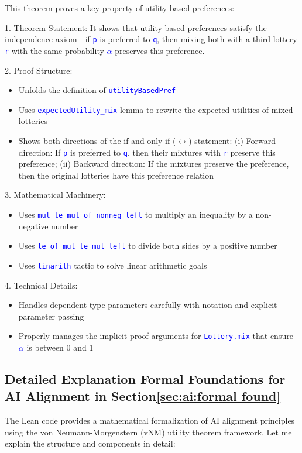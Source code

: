 \documentclass{article}
\theoremstyle{definition}
\newcommand{\tactic}[1]{\textcolor{blue}{\texttt{#1}}}
\begin{document}
This theorem proves a key property of utility-based preferences:

1. Theorem Statement: It shows that utility-based preferences satisfy the independence axiom - if \tactic{p} is preferred to \tactic{q}, then mixing both with a third lottery \tactic{r} with the same probability \tactic{$\alpha$} preserves this preference.

2. Proof Structure:
\begin{itemize}
  \item Unfolds the definition of \tactic{utilityBasedPref}
  \item Uses \tactic{expectedUtility\_mix} lemma to rewrite the expected utilities of mixed lotteries
  \item Shows both directions of the if-and-only-if ($\leftrightarrow$) statement: (i) Forward direction: If \tactic{p} is preferred to \tactic{q}, then their mixtures with \tactic{r} preserve this preference; (ii) Backward direction: If the mixtures preserve the preference, then the original lotteries have this preference relation
\end{itemize}

3. Mathematical Machinery:
\begin{itemize}
  \item Uses \tactic{mul\_le\_mul\_of\_nonneg\_left} to multiply an inequality by a non-negative number
  \item Uses \tactic{le\_of\_mul\_le\_mul\_left} to divide both sides by a positive number
  \item Uses \tactic{linarith} tactic to solve linear arithmetic goals
\end{itemize}

4. Technical Details:
\begin{itemize}
  \item Handles dependent type parameters carefully with \@ notation and explicit parameter passing
  \item Properly manages the implicit proof arguments for \tactic{Lottery.mix} that ensure \tactic{$\alpha$} is between 0 and 1
\end{itemize}

\subsection{Detailed Explanation Formal Foundations for AI Alignment in Section\ref{sec:ai:formal found} }\label{explan: sec:ai:formal found}
The Lean code provides a mathematical formalization of AI alignment principles using the von Neumann-Morgenstern (vNM) utility theorem framework. Let me explain the structure and components in detail:
\end{document}
